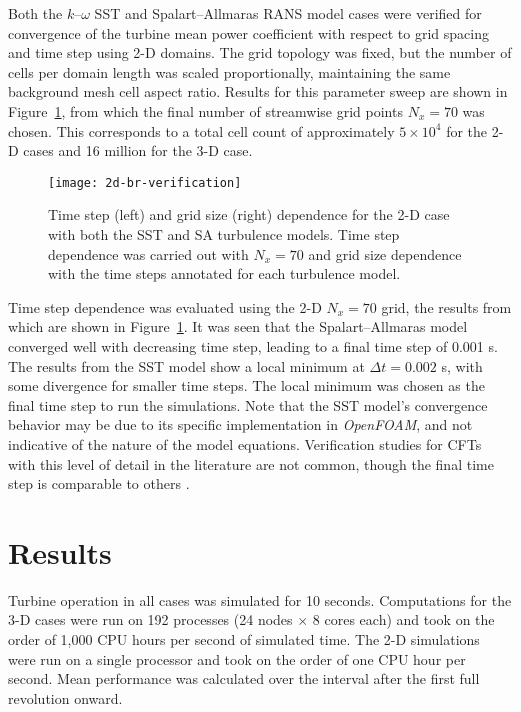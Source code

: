 Both the $k$--$\omega$ SST and Spalart--Allmaras RANS model cases were verified
for convergence of the turbine mean power coefficient with respect to grid
spacing and time step using 2-D domains. The grid topology was fixed, but the
number of cells per domain length was scaled proportionally, maintaining the
same background mesh cell aspect ratio. Results for this parameter sweep are
shown in Figure~\ref{fig:2d-br-verification}, from which the final number of
streamwise grid points $N_x = 70$ was chosen. This corresponds to a total cell
count of approximately $5 \times 10^4$ for the 2-D cases and 16 million for the
3-D case.

\begin{figure}
    \centering

    \texttt{[image: 2d-br-verification]}

    \caption{Time step (left) and grid size (right) dependence for the 2-D case
        with both the SST and SA turbulence models. Time step dependence was carried
        out with $N_x=70$ and grid size dependence with the time steps annotated for
        each turbulence model.}

    \label{fig:2d-br-verification}
\end{figure}

Time step dependence was evaluated using the 2-D $N_x=70$ grid, the results from
which are shown in Figure~\ref{fig:2d-br-verification}. It was seen that the
Spalart--Allmaras model converged well with decreasing time step, leading to a
final time step of 0.001 s. The results from the SST model show a local minimum
at $\Delta t = 0.002$ s, with some divergence for smaller time steps. The local
minimum was chosen as the final time step to run the simulations. Note that the
SST model's convergence behavior may be due to its specific implementation in
\textit{OpenFOAM}, and not indicative of the nature of the model equations.
Verification studies for CFTs with this level of detail in the literature are
not common, though the final time step is comparable to others
\cite{Balduzzi2016}.


\section{Results}

Turbine operation in all cases was simulated for 10 seconds. Computations for
the 3-D cases were run on 192 processes (24 nodes $\times$ 8 cores each) and
took on the order of 1,000 CPU hours per second of simulated time. The 2-D
simulations were run on a single processor and took on the order of one CPU hour
per second. Mean performance was calculated over the interval after the first
full revolution onward.

